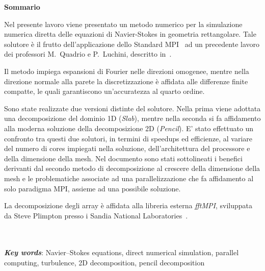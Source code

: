 \documentclass[a4paper,twosides,openright,titlepage]{book}
\newenvironment{abstract}%
	{\cleardoublepage%
		\thispagestyle{empty}%
		\null \vfill\begin{center}%
		\bfseries \abstractname \end{center}}%
	{\vfill\null}
\begin{document}
\renewcommand{\abstractname}{Sommario}
\begin{abstract}
\hrulefill

Nel presente lavoro viene presentato un metodo numerico per la simulazione numerica diretta delle equazioni di Navier-Stokes in geometria rettangolare. Tale solutore è il frutto dell'applicazione dello Standard MPI~\cite{MPI} ad un precedente lavoro dei professori M.~Quadrio e P.~Luchini, descritto in~\cite{cpl:presentazione}. \par
Il metodo impiega espansioni di Fourier nelle direzioni omogenee, mentre nella direzione normale alla parete la discretizzazione è affidata alle differenze finite compatte, le quali garantiscono un'accuratezza al quarto ordine.\par
Sono state realizzate due versioni distinte del solutore. Nella prima viene adottata una decomposizione del dominio 1D (\textit{Slab}), mentre nella seconda si fa affidamento alla moderna soluzione della decomposizione 2D (\textit{Pencil}). 
E' stato effettuato un confronto tra questi due solutori, in termini di speedups ed efficienze, al variare del numero di cores impiegati nella soluzione, dell'architettura del processore e della dimensione della mesh. Nel documento sono stati sottolineati i benefici derivanti dal secondo metodo di decomposizione al crescere della dimensione della mesh e le problematiche associate ad una parallelizzazione che fa affidamento al solo paradigma MPI, assieme ad una possibile soluzione.\par
La decomposizione degli array è affidata alla libreria esterna \emph{fftMPI}, sviluppata da Steve Plimpton presso i Sandia National Laboratories~\cite{fftMPI}.\\~\\~\par

\textbf{\textit{Key words}}: Navier–Stokes equations, direct numerical simulation, parallel computing, turbulence, 2D decomposition, pencil decomposition

\hrulefill
\end{abstract}
\end{document}
